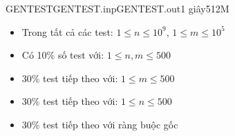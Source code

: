 \begin{problem}{GENTEST}{GENTEST.inp}{GENTEST.out}{1 giây}{512M}
{\Scoring
\begin{itemize}
	\item Trong tất cả các test: $1 \leq n \leq 10^9$, $1 \leq m \leq 10^5$
	\item Có 10\% số test với: $1 \leq n, m \leq 500$
	\item 30\% test tiếp theo với: $1 \leq m \leq 500$
	\item 30\% test tiếp theo với: $1 \leq n \leq 500$
	\item 30\% test tiếp theo với ràng buộc gốc
\end{itemize}

\begin{comment}
\Hint

\end{comment}
}
\end{problem}
